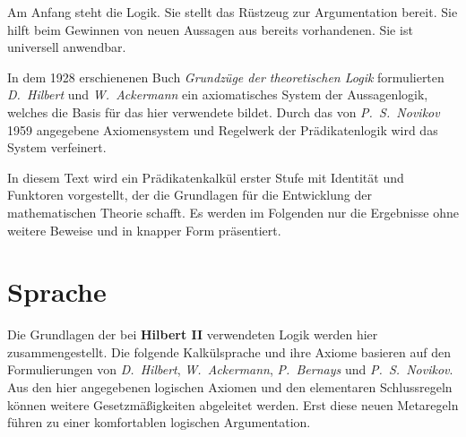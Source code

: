 \documentclass[a4paper,german,10pt,twoside]{book}
\theoremstyle{definition}
\theoremstyle{remark}
\begin{document}
\par
Am Anfang steht die Logik. Sie stellt das R{\"u}stzeug zur Argumentation bereit. Sie hilft beim Gewinnen von neuen Aussagen aus bereits vorhandenen. Sie ist universell anwendbar. 

\par
In dem 1928 erschienenen Buch \emph{Grundz{\"u}ge der theoretischen Logik} formulierten \emph{D.~Hilbert} und \emph{W.~Ackermann} ein axiomatisches System der Aussagenlogik, welches die Basis f{\"u}r das hier verwendete bildet. Durch das von \emph{P.~S.~Novikov} 1959 angegebene Axiomensystem und Regelwerk der Pr{\"a}dikatenlogik wird das System verfeinert.

\par
In diesem Text wird ein Pr{\"a}dikatenkalk{\"u}l erster Stufe mit Identit{\"a}t und Funktoren vorgestellt, der die Grundlagen f{\"u}r die Entwicklung der mathematischen Theorie schafft. Es werden im Folgenden nur die Ergebnisse ohne weitere Beweise und in knapper Form pr{\"a}sentiert.


\chapter{Sprache} \label{chapter3} \hypertarget{chapter3}{}

Die Grundlagen der bei \textbf{Hilbert II} verwendeten Logik werden hier zusammengestellt. Die folgende Kalk{\"u}lsprache und ihre Axiome basieren auf den Formulierungen von \emph{D.~Hilbert}, \emph{W.~Ackermann}, \emph{P.~Bernays} und \emph{P.~S.~Novikov}. Aus den hier angegebenen logischen Axiomen und den elementaren Schlussregeln k{\"o}nnen weitere Gesetzm{\"a}{\ss}igkeiten abgeleitet werden. Erst diese neuen Metaregeln f{\"u}hren zu einer komfortablen logischen Argumentation.
\end{document}
